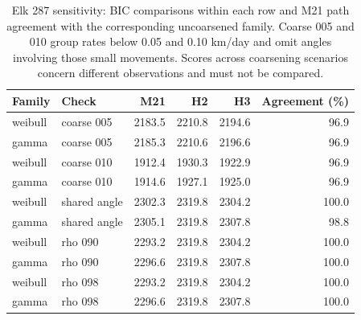 \begin{table}[tbp]
\centering\small
\caption{Elk 287 sensitivity: BIC comparisons within each row and M21 path agreement with the corresponding uncoarsened family. Coarse 005 and 010 group rates below 0.05 and 0.10 km/day and omit angles involving those small movements. Scores across coarsening scenarios concern different observations and must not be compared.}
\label{tab:movement-sensitivity}
\begin{tabular}{llrrrr}
\toprule
Family & Check & M21 & H2 & H3 & Agreement (\%) \\
\midrule
weibull & coarse 005 & 2183.5 & 2210.8 & 2194.6 & 96.9 \\
gamma & coarse 005 & 2185.3 & 2210.6 & 2196.6 & 96.9 \\
weibull & coarse 010 & 1912.4 & 1930.3 & 1922.9 & 96.9 \\
gamma & coarse 010 & 1914.6 & 1927.1 & 1925.0 & 96.9 \\
weibull & shared angle & 2302.3 & 2319.8 & 2304.2 & 100.0 \\
gamma & shared angle & 2305.1 & 2319.8 & 2307.8 & 98.8 \\
weibull & rho 090 & 2293.2 & 2319.8 & 2304.2 & 100.0 \\
gamma & rho 090 & 2296.6 & 2319.8 & 2307.8 & 100.0 \\
weibull & rho 098 & 2293.2 & 2319.8 & 2304.2 & 100.0 \\
gamma & rho 098 & 2296.6 & 2319.8 & 2307.8 & 100.0 \\
\bottomrule
\end{tabular}
\end{table}

